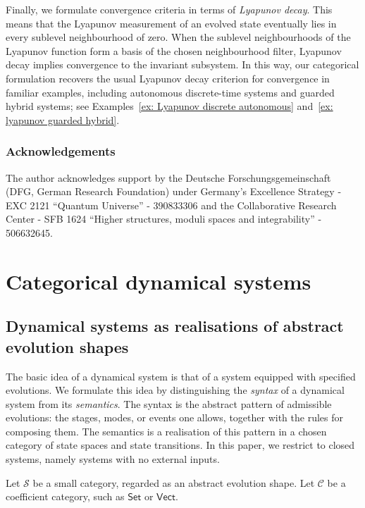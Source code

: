 \documentclass[a4paper,reqno,oneside]{amsart}
\theoremstyle{definition}
\theoremstyle{remark}
\numberwithin{equation}{section}
\begin{document}
Finally, we formulate convergence criteria in terms of \textit{Lyapunov
decay}. This means that the Lyapunov measurement of an evolved state
eventually lies in every sublevel neighbourhood of zero. When the sublevel
neighbourhoods of the Lyapunov function form a basis of the chosen
neighbourhood filter, Lyapunov decay implies convergence to the invariant
subsystem. In this way, our categorical formulation recovers the usual
Lyapunov decay criterion for convergence in familiar examples, including
autonomous discrete-time systems and guarded hybrid systems; see
Examples~\ref{ex: Lyapunov discrete autonomous}
and~\ref{ex: lyapunov guarded hybrid}.



\subsubsection*{\textbf{Acknowledgements}} The author acknowledges support by the Deutsche Forschungsgemeinschaft (DFG, German Research Foundation) under Germany's Excellence Strategy - EXC 2121 ``Quantum Universe'' - 390833306 and the Collaborative Research Center - SFB 1624 ``Higher structures, moduli spaces and integrability'' - 506632645.

	
	
\section{Categorical dynamical systems}
	
\subsection{Dynamical systems as realisations of abstract evolution shapes}
	
	
	The basic idea of a dynamical system is that of a system equipped with
	specified evolutions. We formulate this idea by distinguishing the
	\emph{syntax} of a dynamical system from its \emph{semantics}. The syntax is
	the abstract pattern of admissible evolutions: the stages, modes, or events
	one allows, together with the rules for composing them. The semantics is a
	realisation of this pattern in a chosen category of state spaces and state
	transitions. In this paper, we restrict to closed systems, namely systems with no external inputs.
	
	Let $\mathcal S$ be a small category, regarded as an abstract
	evolution shape. Let $\mathcal C$ be a coefficient category, such as
	$\mathsf{Set}$ or $\mathsf{Vect}$.
	
\end{document}
